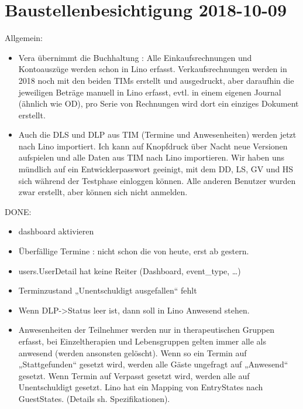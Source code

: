 \documentclass[letterpaper,10pt,ngerman]{sphinxmanual}
\begin{document}
\section{Baustellenbesichtigung 2018-10-09}
\label{\detokenize{changes/20181009:baustellenbesichtigung-2018-10-09}}\label{\detokenize{changes/20181009:tera-20181009}}\label{\detokenize{changes/20181009::doc}}
Allgemein:
\begin{itemize}
\item {} 
Vera übernimmt die Buchhaltung : Alle Einkaufsrechnungen und
Kontoauszüge werden schon in Lino erfasst.  Verkaufsrechnungen
werden in 2018 noch mit den beiden TIMs erstellt und ausgedruckt,
aber daraufhin die jeweiligen Beträge manuell in Lino erfasst,
evtl. in einem eigenen Journal (ähnlich wie OD), pro Serie von
Rechnungen wird dort ein einziges Dokument erstellt.

\item {} 
Auch die DLS und DLP aus TIM (Termine und Anwesenheiten) werden
jetzt nach Lino importiert.  Ich kann auf Knopfdruck über Nacht neue
Versionen aufspielen und alle Daten aus TIM nach Lino
importieren. Wir haben uns mündlich auf ein Entwicklerpasswort
geeinigt, mit dem DD, LS, GV und HS sich während der Testphase
einloggen können.  Alle anderen Benutzer wurden zwar erstellt, aber
können sich nicht anmelden.

\end{itemize}

DONE:
\begin{itemize}
\item {} 
dashboard aktivieren

\item {} 
Überfällige Termine : nicht schon die von heute, erst ab gestern.

\item {} 
users.UserDetail hat keine Reiter (Dashboard, event\_type, …)

\item {} 
Terminzustand „Unentschuldigt ausgefallen“ fehlt

\item {} 
Wenn DLP-\textgreater{}Status leer ist, dann soll in Lino Anwesend stehen.

\item {} 
Anwesenheiten der Teilnehmer werden nur in therapeutischen Gruppen
erfasst, bei Einzeltherapien und Lebensgruppen gelten immer alle als
anwesend (werden ansonsten gelöscht).  Wenn so ein Termin auf
„Stattgefunden“ gesetzt wird, werden alle Gäste ungefragt auf
„Anwesend“ gesetzt.  Wenn Termin auf Verpasst gesetzt wird, werden
alle auf Unentschuldigt gesetzt.  Lino hat ein Mapping von
EntryStates nach GuestStates. (Details sh. Spezifikationen).

\end{itemize}
\end{document}
